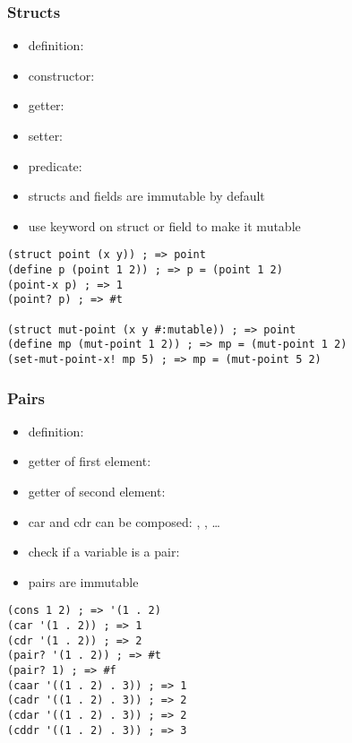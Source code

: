 \documentclass[a4paper,landscape,10pt]{article}
\begin{document}
\begin{multicols*}{2}
  \subsubsection{Structs}

  \begin{itemize}
    \item definition: 
    \item constructor: 
    \item getter: 
    \item setter: 
    \item predicate: 
    \item structs and fields are immutable by default
    \item use  keyword on struct or field to make it mutable
  \end{itemize}

  \begin{lstlisting}[language=Racket]
(struct point (x y)) ; => point
(define p (point 1 2)) ; => p = (point 1 2)
(point-x p) ; => 1
(point? p) ; => #t

(struct mut-point (x y #:mutable)) ; => point
(define mp (mut-point 1 2)) ; => mp = (mut-point 1 2)
(set-mut-point-x! mp 5) ; => mp = (mut-point 5 2)
\end{lstlisting}

  \subsubsection{Pairs}

  \begin{itemize}
    \item definition: 
    \item getter of first element: 
    \item getter of second element: 
    \item car and cdr can be composed: , , \ldots
    \item check if a variable is a pair: 
    \item pairs are immutable
  \end{itemize}

  \begin{lstlisting}[language=Racket]
(cons 1 2) ; => '(1 . 2)
(car '(1 . 2)) ; => 1
(cdr '(1 . 2)) ; => 2
(pair? '(1 . 2)) ; => #t
(pair? 1) ; => #f
(caar '((1 . 2) . 3)) ; => 1
(cadr '((1 . 2) . 3)) ; => 2
(cdar '((1 . 2) . 3)) ; => 2
(cddr '((1 . 2) . 3)) ; => 3
\end{lstlisting}


\end{multicols*}
\end{document}
